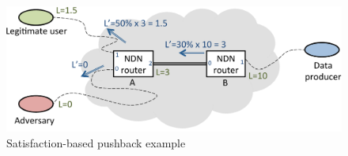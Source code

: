 \documentclass[10pt,conference]{IEEEtran}
\begin{document}
\begin{figure}[t]
  \centering
  \includegraphics[scale=0.3]{dynamic-limits}
  \caption{Satisfaction-based pushback example
}
  \label{fig:dynamic limits example}
\end{figure}


\end{document}
